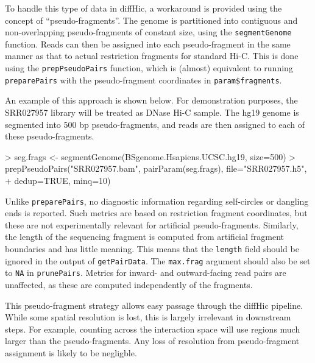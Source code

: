 \documentclass[12pt]{report}
\renewenvironment{Schunk}{\vspace{0pt}}{\vspace{0pt}}
\newcommand{\pkgname}{diffHic}
\newcommand{\code}[1]{{\small\texttt{#1}}}
\begin{document}
To handle this type of data in \pkgname{}, a workaround is provided using the concept of ``pseudo-fragments''.
The genome is partitioned into contiguous and non-overlapping pseudo-fragments of constant size, using the \code{segmentGenome} function.
Reads can then be assigned into each pseudo-fragment in the same manner as that to actual restriction fragments for standard Hi-C.
This is done using the \code{prepPseudoPairs} function, which is (almost) equivalent to running \code{preparePairs} with the pseudo-fragment coordinates in \code{param\$fragments}.

An example of this approach is shown below.
For demonstration purposes, the SRR027957 library will be treated as DNase Hi-C sample.
The hg19 genome is segmented into 500 bp pseudo-fragments, and reads are then assigned to each of these pseudo-fragments.

\begin{Schunk}
\begin{Sinput}
> seg.frags <- segmentGenome(BSgenome.Hsapiens.UCSC.hg19, size=500)
> prepPseudoPairs("SRR027957.bam", pairParam(seg.frags), file="SRR027957.h5", 
+     dedup=TRUE, minq=10)
\end{Sinput}
\end{Schunk}

Unlike \code{preparePairs}, no diagnostic information regarding self-circles or dangling ends is reported.
Such metrics are based on restriction fragment coordinates, but these are not experimentally relevant for artificial pseudo-fragments.
Similarly, the length of the sequencing fragment is computed from artificial fragment boundaries and has little meaning.
This means that the \code{length} field should be ignored in the output of \code{getPairData}.
The \code{max.frag} argument should also be set to \code{NA} in \code{prunePairs}.
Metrics for inward- and outward-facing read pairs are unaffected, as these are computed independently of the fragments.

This pseudo-fragment strategy allows easy passage through the \pkgname{} pipeline.
While some spatial resolution is lost, this is largely irrelevant in downstream steps.
For example, counting across the interaction space will use regions much larger than the pseudo-fragments. 
Any loss of resolution from pseudo-fragment assignment is likely to be negligble.
\end{document}
